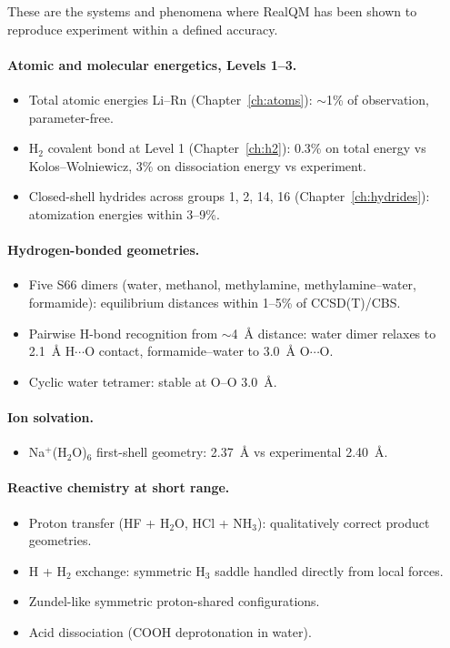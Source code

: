 These are the systems and phenomena where RealQM has been shown to reproduce experiment within a defined accuracy.

\paragraph{Atomic and molecular energetics, Levels 1--3.}
\begin{itemize}
\item Total atomic energies Li--Rn (Chapter~\ref{ch:atoms}): $\sim$1\% of observation, parameter-free.
\item H$_2$ covalent bond at Level 1 (Chapter~\ref{ch:h2}): 0.3\% on total energy vs Kolos--Wolniewicz, 3\% on dissociation energy vs experiment.
\item Closed-shell hydrides across groups 1, 2, 14, 16 (Chapter~\ref{ch:hydrides}): atomization energies within 3--9\%.
\end{itemize}

\paragraph{Hydrogen-bonded geometries.}
\begin{itemize}
\item Five S66 dimers (water, methanol, methylamine, methylamine--water, formamide): equilibrium distances within 1--5\% of CCSD(T)/CBS.
\item Pairwise H-bond recognition from $\sim$4~\AA{} distance: water dimer relaxes to 2.1~\AA{} H$\cdots$O contact, formamide--water to 3.0~\AA{} O$\cdots$O.
\item Cyclic water tetramer: stable at O--O 3.0~\AA.
\end{itemize}

\paragraph{Ion solvation.}
\begin{itemize}
\item Na$^+$(H$_2$O)$_6$ first-shell geometry: 2.37~\AA{} vs experimental 2.40~\AA.
\end{itemize}

\paragraph{Reactive chemistry at short range.}
\begin{itemize}
\item Proton transfer (HF + H$_2$O, HCl + NH$_3$): qualitatively correct product geometries.
\item H + H$_2$ exchange: symmetric H$_3$ saddle handled directly from local forces.
\item Zundel-like symmetric proton-shared configurations.
\item Acid dissociation (COOH deprotonation in water).
\end{itemize}

